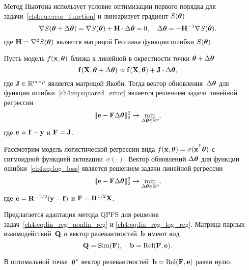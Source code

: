 \documentclass[11pt, a5paper]{dissert}
\begin{document}
Метод Ньютона использует условие оптимизации первого порядка для задачи~\eqref{ch4:eq:error_function} и линеаризует градиент $S (\boldsymbol{\theta})$
\[
	\nabla S (\boldsymbol{\theta} + \Delta \boldsymbol{\theta}) = \nabla S(\boldsymbol{\theta}) + \mathbf{H} \cdot \Delta \boldsymbol{\theta} = 0, \quad
	\Delta \boldsymbol{\theta} = - \mathbf{H}^{-1} \nabla S(\boldsymbol{\theta}).
\]
где $\mathbf{H} = \nabla^2 S(\boldsymbol{\theta})$ является матрицой Гессиана функции ошибки $S(\boldsymbol{\theta})$.

\vspace{0.2cm}
\begin{theorem}
	Пусть модель $f (\mathbf{x} , \boldsymbol{\theta})$ близка к линейной в окрестности точки $\boldsymbol{\theta} + \Delta \boldsymbol{\theta}$
	\begin{equation}
		\mathbf{f}(\mathbf{X} , \boldsymbol{\theta} + \Delta \boldsymbol{\theta}) \approx \mathbf{f}(\mathbf{X} , \boldsymbol{\theta}) + \mathbf{J} \cdot \Delta  \boldsymbol{\theta},
		\label{ch4:eq:linearization}
	\end{equation}
	где $\mathbf{J} \in \mathbb{R}^{m \times p}$ является матрицой Якоби.
	Тогда вектор обновления~$\Delta \boldsymbol{\theta}$ для функции ошибки~\eqref{ch4:eq:squared_error} является решением задачи линейной регрессии
	\begin{equation}
		\| \mathbf{e} - \mathbf{F} \Delta \boldsymbol{\theta} \|_2^2 \rightarrow \min_{\Delta \boldsymbol{\theta} \in \mathbb{R}^{p}},
		\label{ch4:eq:lin_reg_nonlin_reg}
	\end{equation}
	где $\mathbf{e} = \mathbf{f} - \mathbf{y}$ и $\mathbf{F} = \mathbf{J}$.
\end{theorem}

\vspace{0.2cm}
\begin{theorem}
Рассмотрим модель логистической регрессии вида $f(\bx , \btheta) = \sigma(\bx^{\T} \btheta)$ с сигмоидной функцией активации~$\sigma(\cdot)$. 
Вектор обновлений $\Delta \boldsymbol{\theta}$ для функции ошибки~\eqref{ch4:eq:log_loss} является решением задачи линейной регрессии
\begin{equation}
	\| \mathbf{e} - \mathbf{F} \Delta \boldsymbol{\theta} \|_2^2 \rightarrow \min_{\Delta \boldsymbol{\theta} \in \mathbb{R}^{p}},
	\label{ch4:eq:lin_reg_log_reg}
\end{equation}
где $\mathbf{e} = \mathbf{R}^{-1/2} (\mathbf{y} - \mathbf{f})$ и $\mathbf{F} = \mathbf{R}^{1/2}\mathbf{X}$.
\end{theorem}

Предлагается адаптация метода QPFS для решения задач~\eqref{ch4:eq:lin_reg_nonlin_reg} и \eqref{ch4:eq:lin_reg_log_reg}. 
Матрица парных взаимодействий~$\mathbf{Q}$ и вектор релевантностей~$\mathbf{b}$ имеют вид
\[
	\mathbf{Q} = \text{Sim} (\mathbf{F}), \quad \mathbf{b} = \text{Rel} (\mathbf{F}, \mathbf{e}).
\]
\begin{statement}
	В оптимальной точке~$\boldsymbol{\theta}^*$ вектор релевантностей~$\mathbf{b} = \text{Rel} (\mathbf{F}, \mathbf{e})$ равен нулю.
\end{statement}
\vspace{0.2cm}
\end{document}
